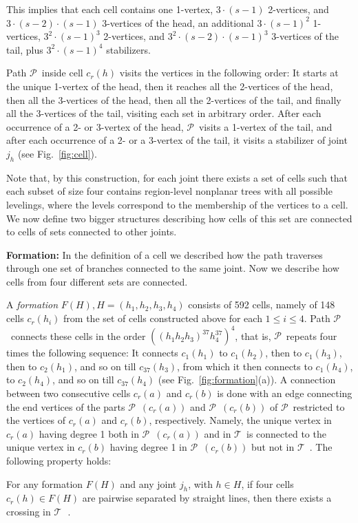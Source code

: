 \documentclass[a4paper,10pt]{llncs}
\newcounter{prop}
\newcommand{\T}{\mbox{$\mathcal T$ }}
\renewcommand{\P}{\mbox{$\mathcal P$ }}
\begin{document}
This implies that each cell contains one 1-vertex, $3 \cdot (s-1)$ 2-vertices, and $3 \cdot(s-2)\cdot (s-1)$ 3-vertices of the head, an additional $3 \cdot (s-1)^2$ 1-vertices, $3^2 \cdot (s-1)^3$ 2-vertices, and $3^2 \cdot (s-2) \cdot (s-1)^3$ 3-vertices of the tail, plus $3^2 \cdot (s-1)^4$ stabilizers.

Path \P inside cell $c_r(h)$ visits the vertices in the following order: It starts at the unique 1-vertex of the head, then it reaches all the 2-vertices of the head, then all the 3-vertices of the head, then all the 2-vertices of the tail, and finally all the 3-vertices of the tail, visiting each set in arbitrary order.
After each occurrence of a 2- or 3-vertex of the head, \P visits a 1-vertex of the tail, and after each occurrence of a 2- or a 3-vertex of the tail, it visits a stabilizer of joint $j_h$ (see Fig.~\ref{fig:cell}).

Note that, by this construction, for each joint there exists a set of cells such that each subset of size four contains region-level nonplanar trees with all possible levelings, where the levels correspond to the membership of the vertices to a cell. We now define two bigger structures describing how cells of this set are connected to cells of sets connected to other joints.

{\bf Formation:}
In the definition of a cell we described how the path traverses through one set of branches connected to the same joint. Now we describe how cells from four different sets are connected.

A {\it formation} $F(H), H=(h_1,h_2,h_3,h_4)$ consists of 592 cells, namely of 148 cells $c_r(h_i)$ from the set of cells constructed above for each $1 \leq i \leq 4$. Path \P connects these cells in the order $((h_1h_2h_3)^{37}h_4^{37})^{4}$, that is, \P repeats four times the following sequence: It connects $c_1(h_1)$ to $c_1(h_2)$, then to $c_1(h_3)$, then to $c_2(h_1)$, and so on till $c_{37}(h_3)$, from which it then connects to $c_1(h_4)$, to $c_2(h_4)$, and so on till $c_{37}(h_4)$ (see Fig.~\ref{fig:formation}(a)). A connection between two consecutive cells $c_r(a)$ and $c_r(b)$ is done with an edge connecting the end vertices of the parts \P$(c_r(a))$ and \P$(c_r(b))$ of \P restricted to the vertices of $c_r(a)$ and $c_r(b)$, respectively. Namely, the unique vertex in $c_r(a)$ having degree 1 both in \P$(c_r(a))$ and in \T is connected to the unique vertex in $c_r(b)$ having degree 1 in \P$(c_r(b))$ but not in \T. The following property holds:

\noindent
\begin{property}\label{prop:four_sep_areas_PS}
For any formation $F(H)$ and any joint $j_h$, with $h\in H$, if four cells $c_r(h) \in F(H)$ are pairwise separated by straight lines, then there exists a crossing in $\T$.
\end{property}
\end{document}
